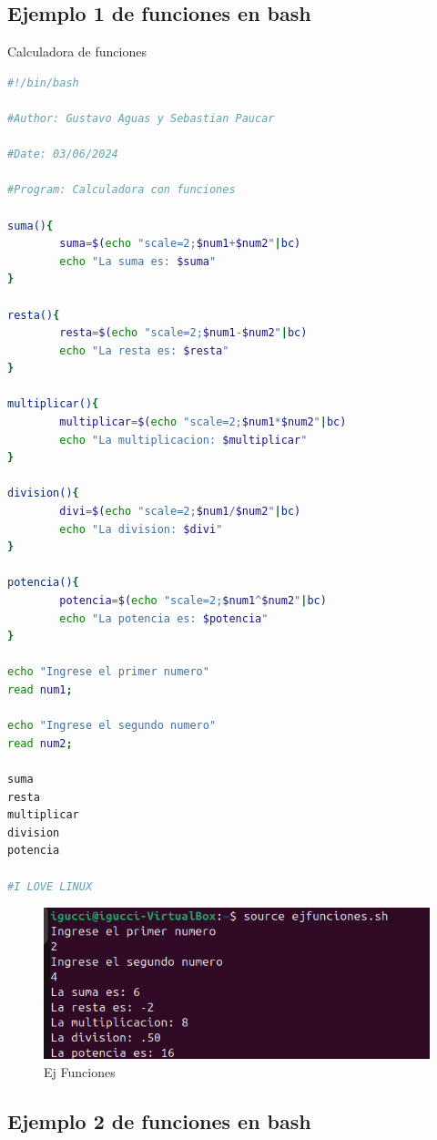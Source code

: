 \documentclass[11pt,twoside]{book}
\begin{document}
\subsection*{Ejemplo 1 de funciones en bash}
Calculadora de funciones
\begin{lstlisting}[language=bash, caption={Calculadora con funciones}]
#!/bin/bash

#Author: Gustavo Aguas y Sebastian Paucar

#Date: 03/06/2024

#Program: Calculadora con funciones

suma(){
        suma=$(echo "scale=2;$num1+$num2"|bc)
        echo "La suma es: $suma"
}

resta(){
        resta=$(echo "scale=2;$num1-$num2"|bc)
        echo "La resta es: $resta"
}

multiplicar(){
        multiplicar=$(echo "scale=2;$num1*$num2"|bc)
        echo "La multiplicacion: $multiplicar"
}

division(){
        divi=$(echo "scale=2;$num1/$num2"|bc)
        echo "La division: $divi"
}

potencia(){
        potencia=$(echo "scale=2;$num1^$num2"|bc)
        echo "La potencia es: $potencia"
}

echo "Ingrese el primer numero"
read num1;

echo "Ingrese el segundo numero"
read num2;

suma
resta
multiplicar
division
potencia

#I LOVE LINUX
\end{lstlisting}

\begin{figure}
    \centering
    \includegraphics[width=1\linewidth]{ejfunc.png}
    \caption{Ej Funciones}
\end{figure}

\subsection*{Ejemplo 2 de funciones en bash}
\end{document}
